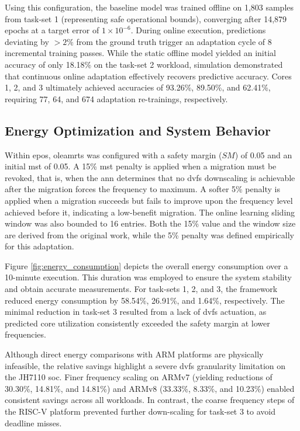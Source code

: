 \documentclass[journal]{IEEEtran}
\begin{document}
Using this configuration, the baseline model was trained offline on 1,803 samples from task-set 1 (representing safe operational bounds), converging after 14,879 epochs at a target error of $1 \times 10^{-6}$. During online execution, predictions deviating by $>2\%$ from the ground truth trigger an adaptation cycle of 8 incremental training passes. While the static offline model yielded an initial accuracy of only 18.18\% on the task-set 2 workload, simulation demonstrated that continuous online adaptation effectively recovers predictive accuracy. Cores 1, 2, and 3 ultimately achieved accuracies of 93.26\%, 89.50\%, and 62.41\%, requiring 77, 64, and 674 adaptation re-trainings, respectively.

\subsection{Energy Optimization and System Behavior}

Within \gls{epos}, \gls{oleamrts} was configured with a safety margin ($SM$) of 0.05 and an initial \gls{mst} of 0.05. A 15\% \gls{mst} penalty is applied when a migration must be revoked, that is, when the \gls{ann} determines that no \gls{dvfs} downscaling is achievable after the migration forces the frequency to maximum. A softer 5\% penalty is applied when a migration succeeds but fails to improve upon the frequency level achieved before it, indicating a low-benefit migration. The online learning sliding window was also bounded to 16 entries. Both the 15\% value and the window size are derived from the original work, while the 5\% penalty was defined empirically for this adaptation.

Figure \ref{fig:energy_consumption} depicts the overall energy consumption over a 10-minute execution. This duration was employed to ensure the system stability and obtain accurate measurements. For task-sets 1, 2, and 3, the framework reduced energy consumption by 58.54\%, 26.91\%, and 1.64\%, respectively. The minimal reduction in task-set 3 resulted from a lack of \gls{dvfs} actuation, as predicted core utilization consistently exceeded the safety margin at lower frequencies.

Although direct energy comparisons with ARM platforms are physically infeasible, the relative savings highlight a severe \gls{dvfs} granularity limitation on the JH7110 \gls{soc}. Finer frequency scaling on ARMv7 (yielding reductions of 30.30\%, 14.81\%, and 14.81\%) and ARMv8 (33.33\%, 8.33\%, and 10.23\%) enabled consistent savings across all workloads. In contrast, the coarse frequency steps of the RISC-V platform prevented further down-scaling for task-set 3 to avoid deadline misses.
\end{document}

